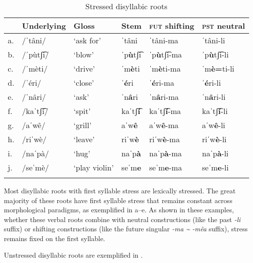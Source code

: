 \begin{table}
\caption{Stressed disyllabic roots}
\label{tab:stressed-disyllabic}

\begin{tabularx}{\textwidth}{lXXXXl}
\lsptoprule
&\textbf{Underlying} & \textbf{Gloss} & \textbf{Stem} & \textbf{\textsc{fut} shifting} & \textbf{\textsc{pst} neutral}  \\
\midrule
a.& /ˈtâni/  &  ‘ask for’ & ˈtâni & ˈtâni-ma & ˈtâni-li \\
b.& /ˈpùtʃ͡i/ &  ‘blow’ & ˈp\textbf{ù}tʃ͡i &   ˈp\textbf{ù}tʃ͡i-ma &  ˈp\textbf{ù}tʃ͡i-li\\
c.& /ˈmèti/   & ‘drive’  & ˈm\textbf{è}ti &  ˈm\textbf{è}ti-ma & ˈm\textbf{è=}ti-li  \\
d.& /ˈéri/ & ‘close’  & ˈ\textbf{é}ri & ˈ\textbf{é}ri-ma   & ˈ\textbf{é}ri-li\\
e.& /ˈnâri/ & ‘ask’  &  ˈn\textbf{â}ri & ˈn\textbf{â}ri-ma & ˈn\textbf{â}ri-li\\
\tablevspace
f.& /kaˈtʃ͡í/&   ‘spit’ &   kaˈtʃ͡\textbf{í} &  kaˈtʃ͡\textbf{í}-ma &  kaˈtʃ͡\textbf{í}{}-li\\
g.& /aˈwê/   & ‘grill’   &  aˈw\textbf{ê} & aˈw\textbf{ê}{}-ma  & aˈw\textbf{ê}{}-li   \\
h.& /riˈwè/  & ‘leave’  &   riˈw\textbf{è} &  riˈw\textbf{è}{}-ma & riˈw\textbf{è}{}-li    \\
i.& /naˈpà/  & ‘hug’   & naˈp\textbf{à}  & naˈp\textbf{à}{}-ma  & naˈp\textbf{à}{}-li\\
j.& /seˈmè/ & ‘play violin’  &    seˈm\textbf{e}  & seˈm\textbf{e}{}-ma  & seˈm\textbf{e}{}-li\\
\lspbottomrule
\end{tabularx}
\end{table}

Most disyllabic roots with first syllable stress are lexically stressed. The great majority of these roots have first syllable stress that remains constant across morphological paradigms, as exemplified in a--e. As shown in these examples, whether these verbal roots combine with neutral constructions (like the past \textit{-li} suffix) or shifting constructions (like the future singular \textit{-ma {\textasciitilde} -mêa} suffix), stress remains fixed on the first syllable.

Unstressed disyllabic roots are exemplified in .

